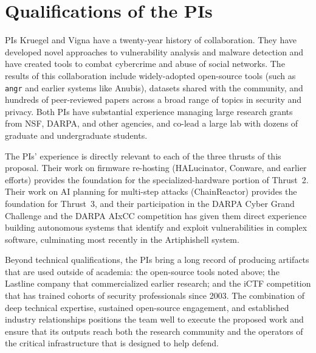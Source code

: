 \section{Qualifications of the PIs}
\label{sec:pis}

PIs Kruegel and Vigna have a twenty-year history of collaboration.
They have developed novel approaches to vulnerability analysis and
malware detection and have created tools to combat cybercrime and
abuse of social networks. The results of this collaboration include
widely-adopted open-source tools (such as \texttt{angr} and earlier
systems like Anubis), datasets shared with the community, and
hundreds of peer-reviewed papers across a broad range of topics in
security and privacy. Both PIs have substantial experience managing
large research grants from NSF, DARPA, and other agencies, and
co-lead a large lab with dozens of graduate and undergraduate students.

The PIs' experience is directly relevant to each of the three thrusts
of this proposal. Their work on firmware re-hosting (HALucinator,
Conware, and earlier efforts) provides the foundation for the
specialized-hardware portion of Thrust~2. Their work on AI planning
for multi-step attacks (ChainReactor) provides the foundation for
Thrust~3, and their participation in the DARPA Cyber Grand Challenge
and the DARPA AIxCC competition has given them direct experience
building autonomous systems that identify and exploit vulnerabilities
in complex software, culminating most recently in the Artiphishell
system.

Beyond technical qualifications, the PIs bring a long record of
producing artifacts that are used outside of academia: the open-source
tools noted above; the Lastline company that commercialized earlier
research; and the iCTF competition that has trained cohorts of
security professionals since 2003. The combination of deep technical
expertise, sustained open-source engagement, and established industry
relationships positions the team well to execute the proposed work
and ensure that its outputs reach both the research community and the
operators of the critical infrastructure that \sysname is designed to
help defend.
